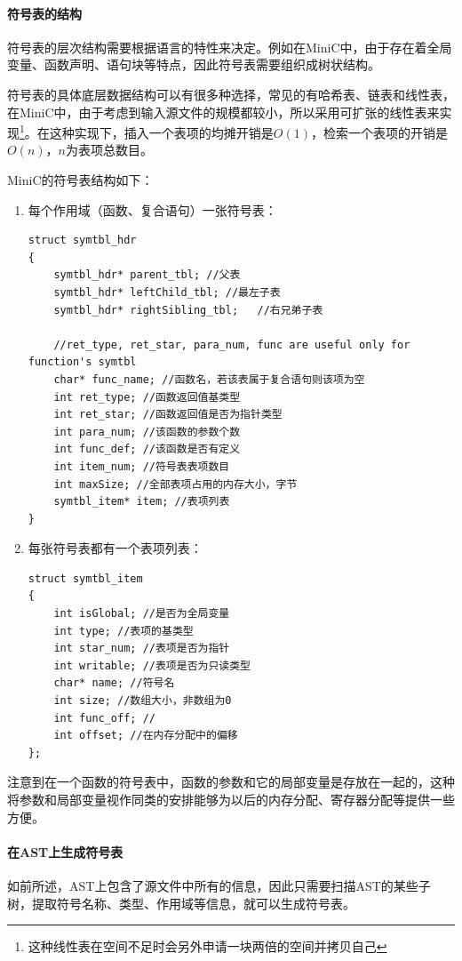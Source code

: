 \paragraph*{符号表的结构}
符号表的层次结构需要根据语言的特性来决定。例如在MiniC中，由于存在着全局变量、函数声明、语句块等特点，因此符号表需要组织成树状结构。

符号表的具体底层数据结构可以有很多种选择，常见的有哈希表、链表和线性表，在MiniC中，由于考虑到输入源文件的规模都较小，所以采用可扩张的线性表来实现\footnote{这种线性表在空间不足时会另外申请一块两倍的空间并拷贝自己}。在这种实现下，插入一个表项的均摊开销是$O(1)$，检索一个表项的开销是$O(n)$，$n$为表项总数目。


MiniC的符号表结构如下：
\begin{enumerate}
\item 每个作用域（函数、复合语句）一张符号表：
\begin{lstlisting}
struct symtbl_hdr
{
	symtbl_hdr* parent_tbl; //父表
	symtbl_hdr* leftChild_tbl; //最左子表
	symtbl_hdr* rightSibling_tbl;	//右兄弟子表

	//ret_type, ret_star, para_num, func are useful only for function's symtbl
	char* func_name; //函数名，若该表属于复合语句则该项为空
	int ret_type; //函数返回值基类型
	int ret_star; //函数返回值是否为指针类型
	int para_num; //该函数的参数个数
	int func_def; //该函数是否有定义
	int item_num; //符号表表项数目
	int maxSize; //全部表项占用的内存大小，字节
	symtbl_item* item; //表项列表
}
\end{lstlisting}
\item 每张符号表都有一个表项列表：
\begin{lstlisting}
struct symtbl_item
{
	int isGlobal; //是否为全局变量
	int type; //表项的基类型
	int star_num; //表项是否为指针
	int writable; //表项是否为只读类型
	char* name; //符号名 
	int size; //数组大小，非数组为0
	int func_off; //
	int offset; //在内存分配中的偏移
};

\end{lstlisting}
\end{enumerate}
注意到在一个函数的符号表中，函数的参数和它的局部变量是存放在一起的，这种将参数和局部变量视作同类的安排能够为以后的内存分配、寄存器分配等提供一些方便。



\paragraph*{在AST上生成符号表}
如前所述，AST上包含了源文件中所有的信息，因此只需要扫描AST的某些子树，提取符号名称、类型、作用域等信息，就可以生成符号表。

